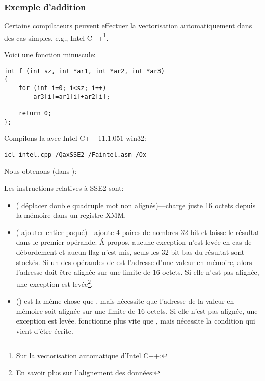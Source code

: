 \subsubsection{Exemple d'addition}


Certains compilateurs peuvent effectuer la vectorisation automatiquement dans des
cas simples, e.g., Intel C++\footnote{Sur la vectorisation automatique d'Intel C++:
\URLINTELVEC}.

Voici une fonction minuscule:

\begin{lstlisting}[style=customc]
int f (int sz, int *ar1, int *ar2, int *ar3)
{
	for (int i=0; i<sz; i++)
		ar3[i]=ar1[i]+ar2[i];

	return 0;
};
\end{lstlisting}


Compilons la avec Intel C++ 11.1.051 win32:

\begin{verbatim}
icl intel.cpp /QaxSSE2 /Faintel.asm /Ox
\end{verbatim}

Nous obtenons (dans \IDA):



Les instructions relatives à SSE2 sont:
\begin{itemize}
\item
\MOVDQU ( déplacer double quadruple mot non
alignés)---charge juste 16 octets depuis la mémoire dans un registre XMM.

\item
\PADDD ( ajouter entier paqué)---ajoute 4 paires de nombres
32-bit et laisse le résultat dans le premier opérande.
Á propos, aucune exception n'est levée en cas de débordement et aucun flag n'est mis,
seuls les 32-bit bas du résultat sont stockés.
Si un des opérandes de \PADDD est l'adresse d'une valeur en mémoire, alors l'adresse
doit être alignée sur une limite de 16 octets.
Si elle n'est pas alignée, une exception est levée\footnote{En savoir plus sur l'alignement
des données: \URLWPDA}.

\item
\MOVDQA () est la même chose que \MOVDQU, mais nécessite
que l'adresse de la valeur en mémoire soit alignée sur une limite de 16 octets. Si
elle n'est pas alignée, une exception est levée.
\MOVDQA fonctionne plus vite que \MOVDQU, mais nécessite la condition qui vient d'être
écrite.

\end{itemize}

